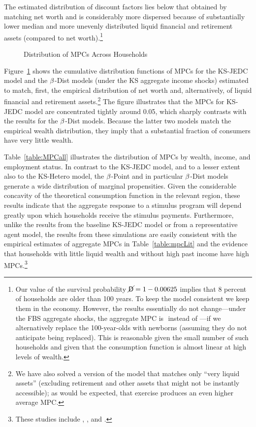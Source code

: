 \documentclass[12pt,titlepage]{econtex}
\begin{document}
The estimated distribution of discount factors lies below that obtained by matching net worth and is considerably more dispersed because of substantially lower median and more unevenly distributed liquid financial and retirement assets (compared to net worth).\footnote{Our value of the survival probability $\cancel{\mathsf{D}}=1 -0.00625$ implies that 8 percent of households are older than 100 years. To keep the model consistent we keep them in the economy.  However, the results essentially do not change---under the FBS aggregate shocks, the aggregate MPC is
$
 $
instead of
$
 $---if we alternatively replace the 100-year-olds with newborns (assuming they do not anticipate being replaced). This is reasonable given the small number of such households and given that the consumption function is almost linear at high levels of wealth.
}

\begin{figure}
\caption{Distribution of MPCs Across Households}
\label{MPCdist}
\end{figure}

Figure~\ref{MPCdist} shows the cumulative distribution functions of
MPCs for the KS-JEDC model and the $\beta$-Dist models (under the KS aggregate income shocks) estimated to match, first, the empirical distribution of net worth and, alternatively, of liquid
financial and retirement assets.\footnote{We have also solved a version of the model
that matches only ``very liquid assets'' (excluding retirement and other assets that might not be instantly accessible); as would be expected, that exercise produces an even higher average MPC.}  The figure illustrates that the MPCs for KS-JEDC model are concentrated tightly around 0.05, which sharply
contrasts with the results for the $\beta$-Dist models. Because
the latter two models match the empirical wealth distribution, they
imply that a substantial fraction of consumers have very little
wealth.

Table~\ref{table:MPCall} illustrates the distribution of MPCs by wealth, income, and employment status. In contrast to the KS-JEDC model, and to a lesser extent also to the KS-Hetero model, the $\beta$-Point and in particular $\beta$-Dist models generate a wide distribution of marginal propensities.  Given the considerable concavity of the theoretical consumption function in the relevant region, these results indicate that the aggregate response to a stimulus program will depend greatly upon which households receive the stimulus payments.  Furthermore, unlike the results from the baseline KS-JEDC model or from a representative agent model, the results from these simulations are easily consistent with the empirical estimates of aggregate MPCs in Table~\ref{table:mpcLit} and the evidence that households with little liquid wealth and without high past income have high MPCs.\footnote{These studies include \citet{bppInequality}, \citet{brodaParker:stimulus2008}, \citet{leth-petersen:liquidity} and \citet{jappelliPistaferri_FPMPC}.}
\end{document}
